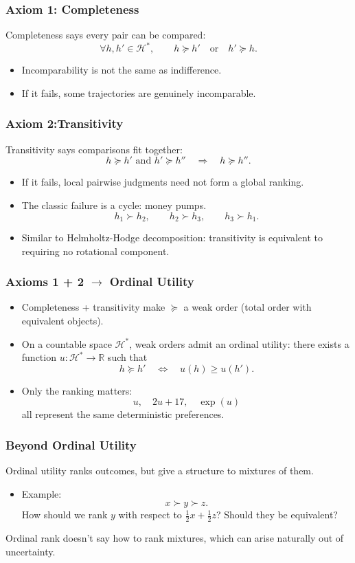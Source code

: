 \documentclass[10pt,a4paper]{beamer}
\newcommand{\Hcal}{\mathcal{H}}
\newcommand{\R}{\mathbb{R}}
\newcommand{\pref}{\succcurlyeq}
\newcommand{\strictpref}{\succ}
\begin{document}
\begin{frame}
\frametitle{Axiom 1: Completeness}
Completeness says every pair can be compared:
    $$
    \forall h,h'\in\Hcal^*,\qquad h\pref h'
    \quad\text{or}\quad h'\pref h.
    $$
\pause
\begin{itemize}
    \item Incomparability is not the same as indifference.
    \pause
    \item If it fails, some trajectories are genuinely incomparable.
\end{itemize}
\end{frame}

\begin{frame}
\frametitle{Axiom 2:Transitivity}
Transitivity says comparisons fit together:
    $$
    h\pref h'\text{ and }h'\pref h''
    \quad\Longrightarrow\quad
    h\pref h''.
    $$
    \pause
\begin{itemize}
    \item If it fails, local pairwise judgments need not form a global ranking.
    \pause
    \item The classic failure is a cycle: money pumps.
    $$
    h_1\strictpref h_2,\qquad
    h_2\strictpref h_3,\qquad
    h_3\strictpref h_1.
    $$
    \item Similar to Helmholtz-Hodge decomposition: transitivity is equivalent to requiring no rotational component.
\end{itemize}
\end{frame}



\begin{frame}
\frametitle{Axioms 1 + 2 $\to$ Ordinal Utility}
\begin{itemize}
    \item Completeness + transitivity make $\pref$ a weak order (total order with equivalent objects).
    \pause
    \item On a countable space $\Hcal^*$, weak orders admit an ordinal utility: 
    there exists a function $u:\Hcal^*\to\R$ such that
    $$
    h\pref h'
    \quad\Longleftrightarrow\quad
    u(h)\geq u(h').
    $$
    \pause
    \item Only the ranking matters:
    $$
    u,\quad 2u+17,\quad \exp(u)
    $$
    all represent the same deterministic preferences.
\end{itemize}
\end{frame}



\begin{frame}
\frametitle{Beyond Ordinal Utility}
Ordinal utility ranks outcomes, but give a structure to mixtures of them.
\vspace{0.4cm}
\begin{itemize}
    \item Example:
    $$
    x\strictpref y\strictpref z.
    $$
    How should we rank $y$ with respect to
    $\tfrac12 x+\tfrac12 z$? Should they be equivalent?
    \pause
\end{itemize}
\vspace{0.4cm}
Ordinal rank doesn't say how to rank mixtures, which can arise naturally out of uncertainty.
\end{frame}
\end{document}
